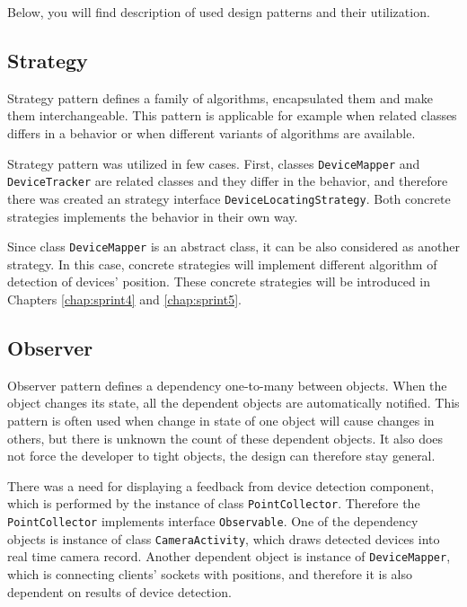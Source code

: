 Below, you will find description of used design patterns and their utilization.

\subsection{Strategy}
Strategy pattern defines a family of algorithms, encapsulated them and make them interchangeable\cite[p.~349]{Gamma:1995:DPE:186897}.
This pattern is applicable for example when related classes differs in a behavior or when different variants of algorithms are available.

Strategy pattern was utilized in few cases.
First, classes \texttt{DeviceMapper} and \texttt{DeviceTracker} are related classes and they differ in the behavior, and therefore there was created an strategy interface \texttt{DeviceLocatingStrategy}.
Both concrete strategies implements the behavior in their own way.

Since class \texttt{DeviceMapper} is an abstract class, it can be also considered as another strategy.
In this case, concrete strategies will implement different algorithm of detection of devices' position.
These concrete strategies will be introduced in Chapters \ref{chap:sprint4} and \ref{chap:sprint5}.

\subsection{Observer}
Observer pattern defines a dependency one-to-many between objects.
When the object changes its state, all the dependent objects are automatically notified.
This pattern is often used when change in state of one object will cause changes in others, but there is unknown the count of these dependent objects.
It also does not force the developer to tight objects, the design can therefore stay general. \cite[p.~327]{Gamma:1995:DPE:186897}

There was a need for displaying a feedback from device detection component, which is performed by the instance of class \texttt{PointCollector}.
Therefore the \texttt{PointCollector} implements interface \texttt{Observable}.
One of the dependency objects is instance of class \texttt{CameraActivity}, which draws detected devices into real time camera record.
Another dependent object is instance of \texttt{DeviceMapper}, which is connecting clients' sockets with positions, and therefore it is also dependent on results of device detection.